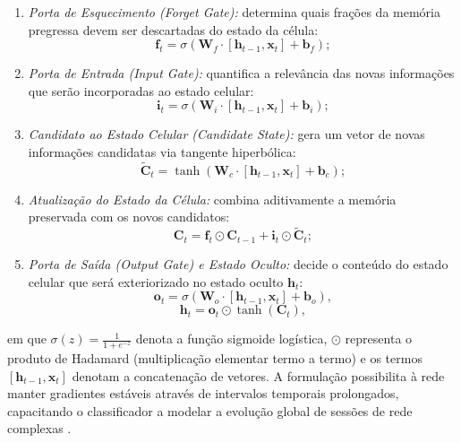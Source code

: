 \begin{enumerate}
    \item \emph{Porta de Esquecimento (\emph{Forget Gate}):} determina quais frações da memória pregressa devem ser descartadas do estado da célula:
    \begin{equation}
    \label{eq:lstm_forget}
    \mathbf{f}_t = \sigma \left( \mathbf{W}_f \cdot [\mathbf{h}_{t-1}, \mathbf{x}_t] + \mathbf{b}_f \right);
    \end{equation}
    \item \emph{Porta de Entrada (\emph{Input Gate}):} quantifica a relevância das novas informações que serão incorporadas ao estado celular:
    \begin{equation}
    \label{eq:lstm_input}
    \mathbf{i}_t = \sigma \left( \mathbf{W}_i \cdot [\mathbf{h}_{t-1}, \mathbf{x}_t] + \mathbf{b}_i \right);
    \end{equation}
    \item \emph{Candidato ao Estado Celular (\emph{Candidate State}):} gera um vetor de novas informações candidatas via tangente hiperbólica:
    \begin{equation}
    \label{eq:lstm_candidate}
    \tilde{\mathbf{C}}_t = \tanh \left( \mathbf{W}_c \cdot [\mathbf{h}_{t-1}, \mathbf{x}_t] + \mathbf{b}_c \right);
    \end{equation}
    \item \emph{Atualização do Estado da Célula:} combina aditivamente a memória preservada com os novos candidatos:
    \begin{equation}
    \label{eq:lstm_update}
    \mathbf{C}_t = \mathbf{f}_t \odot \mathbf{C}_{t-1} + \mathbf{i}_t \odot \tilde{\mathbf{C}}_t;
    \end{equation}
    \item \emph{Porta de Saída (\emph{Output Gate}) e Estado Oculto:} decide o conteúdo do estado celular que será exteriorizado no estado oculto $\mathbf{h}_t$:
    \begin{equation}
    \label{eq:lstm_output}
    \mathbf{o}_t = \sigma \left( \mathbf{W}_o \cdot [\mathbf{h}_{t-1}, \mathbf{x}_t] + \mathbf{b}_o \right),
    \end{equation}
    \begin{equation}
    \label{eq:lstm_hidden}
    \mathbf{h}_t = \mathbf{o}_t \odot \tanh(\mathbf{C}_t),
    \end{equation}
\end{enumerate}
em que $\sigma(z) = \frac{1}{1 + e^{-z}}$ denota a função sigmoide logística, $\odot$ representa o produto de Hadamard (multiplicação elementar termo a termo) e os termos $[\mathbf{h}_{t-1}, \mathbf{x}_t]$ denotam a concatenação de vetores. A formulação possibilita à rede manter gradientes estáveis através de intervalos temporais prolongados, capacitando o classificador a modelar a evolução global de sessões de rede complexas \cite{temporal2025}.

